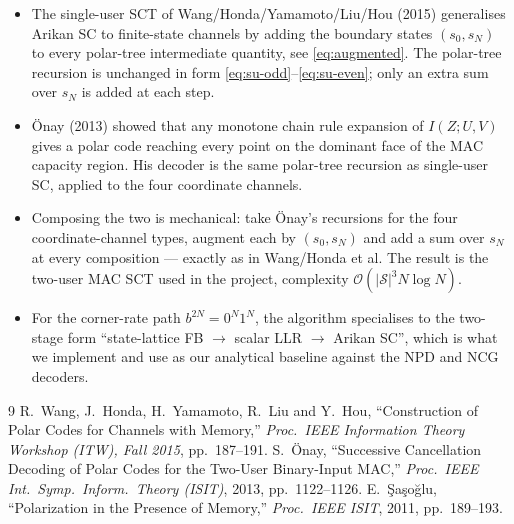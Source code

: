 \documentclass[11pt]{article}
\newcommand{\BigOh}{\mathcal{O}}
\begin{document}
\begin{itemize}[leftmargin=*]
\item The single-user SCT of Wang/Honda/Yamamoto/Liu/Hou (2015) generalises
      Arikan SC to finite-state channels by adding the boundary states
      $(s_0, s_N)$ to every polar-tree intermediate quantity, see
      \eqref{eq:augmented}.  The polar-tree recursion is unchanged in form
      \eqref{eq:su-odd}--\eqref{eq:su-even}; only an extra sum over $s_N$ is
      added at each step.
\item \"{O}nay (2013) showed that any monotone chain rule expansion of
      $I(Z; U, V)$ gives a polar code reaching every point on the dominant
      face of the MAC capacity region.  His decoder is the same polar-tree
      recursion as single-user SC, applied to the four coordinate channels.
\item Composing the two is mechanical: take \"{O}nay's recursions for the
      four coordinate-channel types, augment each by $(s_0, s_N)$ and add a
      sum over $s_N$ at every composition --- exactly as in Wang/Honda et
      al.  The result is the two-user MAC SCT used in the project,
      complexity $\BigOh(|\mathcal{S}|^3 N \log N)$.
\item For the corner-rate path $b^{2N}=0^N 1^N$, the algorithm specialises
      to the two-stage form ``state-lattice FB $\to$ scalar LLR $\to$
      Arikan SC'', which is what we implement and use as our analytical
      baseline against the NPD and NCG decoders.
\end{itemize}

\begin{thebibliography}{9}
R.~Wang, J.~Honda, H.~Yamamoto, R.~Liu and Y.~Hou,
``Construction of Polar Codes for Channels with Memory,''
\emph{Proc.\ IEEE Information Theory Workshop (ITW), Fall 2015}, pp.~187--191.
S.~\"{O}nay,
``Successive Cancellation Decoding of Polar Codes for the Two-User Binary-Input MAC,''
\emph{Proc.\ IEEE Int.\ Symp.\ Inform.\ Theory (ISIT)}, 2013, pp.~1122--1126.
E.~\c{S}a\c{s}o\u{g}lu,
``Polarization in the Presence of Memory,''
\emph{Proc.\ IEEE ISIT}, 2011, pp.~189--193.
\end{thebibliography}
\end{document}

